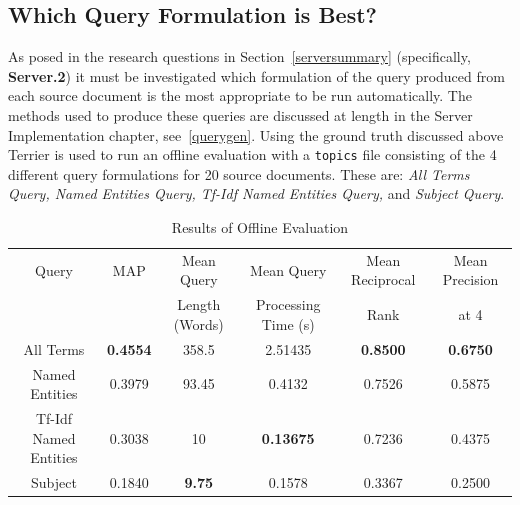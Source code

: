 \documentclass{l4proj}
\newcommand{\code}[1]{\texttt{#1}}
\begin{document}
\subsection{Which Query Formulation is Best?} \label{whichquery}
As posed in the research questions in Section~\ref{serversummary} (specifically, \textbf{Server.2}) it must be investigated which formulation of the query produced from each source document is the most appropriate to be run automatically. The methods used to produce these queries are discussed at length in the Server Implementation chapter, see~\ref{querygen}.
Using the ground truth discussed above Terrier is used to run an offline evaluation with a \code{topics} file consisting of the 4 different query formulations for 20 source documents. These are: \textit{All Terms Query, Named Entities Query, Tf-Idf Named Entities Query,} and \textit{Subject Query}.
\begin{center}
\begin{table}[h]
\centering
\begin{tabular}{|c|c|c|c|c|c|}
\hline
Query					& MAP 				& Mean Query  		& Mean Query 			& Mean Reciprocal 		& Mean Precision 	\\ 
						& 					& Length (Words) 	& Processing Time (s) 	& Rank 					& at 4				\\	\hline
All Terms             	& \textbf{0.4554} 	& 358.5             & 2.51435               & \textbf{0.8500}       & \textbf{0.6750} 	\\	\hline
Named Entities 			& 0.3979 			& 93.45    			& 0.4132 				& 0.7526				& 0.5875 			\\	\hline
Tf-Idf Named Entities 	& 0.3038 			& 10                & \textbf{0.13675}      & 0.7236       			& 0.4375 			\\	\hline
Subject               	& 0.1840 			& \textbf{9.75}     & 0.1578                & 0.3367       			& 0.2500 			\\	\hline
\end{tabular}
\caption{Results of Offline Evaluation}
\label{standard_results}
\end{table}
\end{center}
\end{document}
